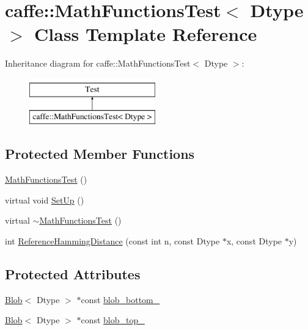\hypertarget{classcaffe_1_1_math_functions_test}{\section{caffe\+:\+:Math\+Functions\+Test$<$ Dtype $>$ Class Template Reference}
\label{classcaffe_1_1_math_functions_test}
}
Inheritance diagram for caffe\+:\+:Math\+Functions\+Test$<$ Dtype $>$\+:\begin{figure}[H]
\begin{center}
\leavevmode
\includegraphics[height=2.000000cm]{classcaffe_1_1_math_functions_test}
\end{center}
\end{figure}
\subsection*{Protected Member Functions}
\begin{DoxyCompactItemize}
\item 
\hyperlink{classcaffe_1_1_math_functions_test_afc888e08659197a2127f87c5f6194e55}{Math\+Functions\+Test} ()
\item 
virtual void \hyperlink{classcaffe_1_1_math_functions_test_a93b8a67e99e6f975bf539daf193b1a8e}{Set\+Up} ()
\item 
virtual \hyperlink{classcaffe_1_1_math_functions_test_ab071770d4f515a095093b2cf3e718df3}{$\sim$\+Math\+Functions\+Test} ()
\item 
int \hyperlink{classcaffe_1_1_math_functions_test_a6c8c13893f7ab3b5e38ebc50226862bc}{Reference\+Hamming\+Distance} (const int n, const Dtype $\ast$x, const Dtype $\ast$y)
\end{DoxyCompactItemize}
\subsection*{Protected Attributes}
\begin{DoxyCompactItemize}
\item 
\hyperlink{classcaffe_1_1_blob}{Blob}$<$ Dtype $>$ $\ast$const \hyperlink{classcaffe_1_1_math_functions_test_acd87accc66124e064d86484a4213afd8}{blob\+\_\+bottom\+\_\+}
\item 
\hyperlink{classcaffe_1_1_blob}{Blob}$<$ Dtype $>$ $\ast$const \hyperlink{classcaffe_1_1_math_functions_test_a260c2e90738ed8b2d66e18f7589ffef0}{blob\+\_\+top\+\_\+}
\end{DoxyCompactItemize}


